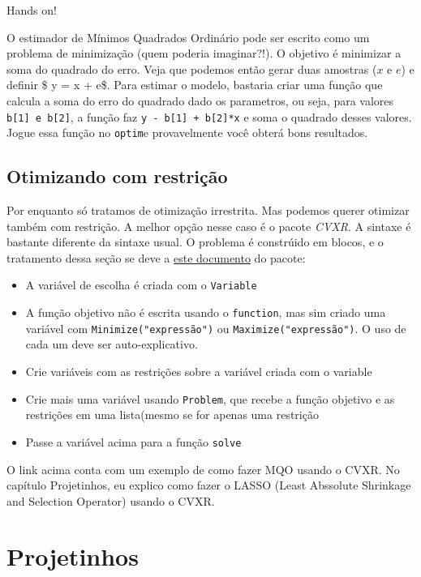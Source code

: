 \documentclass[]{book}
\providecommand{\tightlist}{%
  \setlength{\itemsep}{0pt}\setlength{\parskip}{0pt}}
\begin{document}
Hands on!

O estimador de Mínimos Quadrados Ordinário pode ser escrito como um
problema de minimização (quem poderia imaginar?!). O objetivo é
minimizar a soma do quadrado do erro. Veja que podemos então gerar duas
amostras (\(x\) e \(e\)) e definir \$ y = x + e\$. Para estimar o
modelo, bastaria criar uma função que calcula a soma do erro do quadrado
dado os parametros, ou seja, para valores
\texttt{b{[}1{]}\ e\ b{[}2{]}}, a função faz
\texttt{y\ -\ b{[}1{]}\ +\ b{[}2{]}*x} e soma o quadrado desses valores.
Jogue essa função no \texttt{optim}e provavelmente você obterá bons
resultados.

\section{Otimizando com restrição}\label{otimizando-com-restricao}

Por enquanto só tratamos de otimização irrestrita. Mas podemos querer
otimizar também com restrição. A melhor opção nesse caso é o pacote
\emph{CVXR}. A sintaxe é bastante diferente da sintaxe usual. O problema
é constrúido em blocos, e o tratamento dessa seção se deve a
\href{https://cran.r-project.org/web/packages/CVXR/vignettes/cvxr_intro.html}{este
documento} do pacote:

\begin{itemize}
\tightlist
\item
  A variável de escolha é criada com o \texttt{Variable}
\item
  A função objetivo não é escrita usando o \texttt{function}, mas sim
  criado uma variável com \texttt{Minimize("expressão")} ou
  \texttt{Maximize("expressão")}. O uso de cada um deve ser
  auto-explicativo.
\item
  Crie variáveis com as restrições sobre a variável criada com o
  variable
\item
  Crie mais uma variável usando \texttt{Problem}, que recebe a função
  objetivo e as restrições em uma lista(mesmo se for apenas uma
  restrição
\item
  Passe a variável acima para a função \texttt{solve}
\end{itemize}

O link acima conta com um exemplo de como fazer MQO usando o CVXR. No
capítulo Projetinhos, eu explico como fazer o LASSO (Least Abssolute
Shrinkage and Selection Operator) usando o CVXR.

\chapter{Projetinhos}\label{projetinhos}
\end{document}
